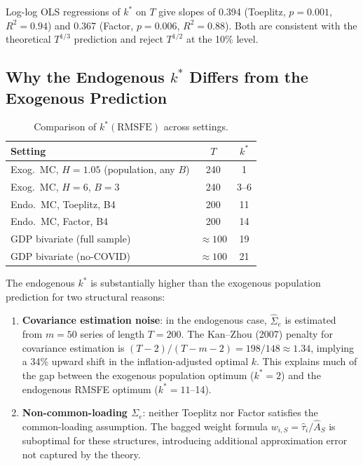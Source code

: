 \documentclass[12pt,a4paper]{article}
\theoremstyle{definition}
\begin{document}
Log-log OLS regressions of $k^*$ on $T$ give slopes of 0.394 (Toeplitz,
$p=0.001$, $R^2=0.94$) and 0.367 (Factor, $p=0.006$, $R^2=0.88$). Both
are consistent with the theoretical $T^{1/3}$ prediction and reject $T^{1/2}$
at the 10\% level.

\subsection{Why the Endogenous $k^*$ Differs from the Exogenous Prediction}

\begin{table}[ht]
\centering
\caption{Comparison of $k^*(\text{RMSFE})$ across settings.}
\label{tab:kstar_compare}
\begin{tabular}{lcc}
\toprule
Setting & $T$ & $k^*$ \\
\midrule
Exog.\ MC, $H=1.05$ (population, any $B$) & 240 & 1 \\
Exog.\ MC, $H=6$, $B=3$ & 240 & 3--6 \\
Endo.\ MC, Toeplitz, B4 & 200 & 11 \\
Endo.\ MC, Factor, B4   & 200 & 14 \\
GDP bivariate (full sample)  & $\approx 100$ & 19 \\
GDP bivariate (no-COVID)     & $\approx 100$ & 21 \\
\bottomrule
\end{tabular}
\end{table}

The endogenous $k^*$ is substantially higher than the exogenous population
prediction for two structural reasons:
\begin{enumerate}
\item \textbf{Covariance estimation noise}: in the endogenous case,
  $\hat\Sigma_e$ is estimated from $m=50$ series of length $T=200$.
  The Kan--Zhou (2007) penalty for covariance estimation is
  $(T-2)/(T-m-2)=198/148\approx1.34$, implying a 34\% upward shift in
  the inflation-adjusted optimal $k$. This explains much of the gap between
  the exogenous population optimum ($k^*=2$) and the endogenous RMSFE optimum ($k^*=11$--14).
\item \textbf{Non-common-loading $\Sigma_e$}: neither Toeplitz nor Factor
  satisfies the common-loading assumption. The bagged weight formula
  $w_{i,S}=\hat\tau_i/\hat A_S$ is suboptimal for these structures,
  introducing additional approximation error not captured by the theory.
\end{enumerate}
\end{document}
